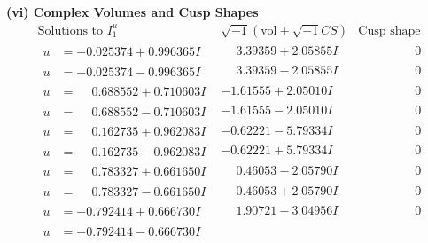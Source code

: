 \documentclass[1p]{elsarticle_modified}
\theoremstyle{definition}
\newcommand{\I}{\sqrt{-1}}
\begin{document}
\newpage\flushleft \textbf{(vi) Complex Volumes and Cusp Shapes}
$$\begin{array}{c|c|c}  
\text{Solutions to }I^u_{1}& \I (\text{vol} + \sqrt{-1}CS) & \text{Cusp shape}\\
 \hline 
\begin{aligned}
u &= -0.025374 + 0.996365 I\end{aligned}
 & \phantom{-}3.39359 + 2.05855 I & \phantom{-0.000000 } 0 \\ \hline\begin{aligned}
u &= -0.025374 - 0.996365 I\end{aligned}
 & \phantom{-}3.39359 - 2.05855 I & \phantom{-0.000000 } 0 \\ \hline\begin{aligned}
u &= \phantom{-}0.688552 + 0.710603 I\end{aligned}
 & -1.61555 + 2.05010 I & \phantom{-0.000000 } 0 \\ \hline\begin{aligned}
u &= \phantom{-}0.688552 - 0.710603 I\end{aligned}
 & -1.61555 - 2.05010 I & \phantom{-0.000000 } 0 \\ \hline\begin{aligned}
u &= \phantom{-}0.162735 + 0.962083 I\end{aligned}
 & -0.62221 - 5.79334 I & \phantom{-0.000000 } 0 \\ \hline\begin{aligned}
u &= \phantom{-}0.162735 - 0.962083 I\end{aligned}
 & -0.62221 + 5.79334 I & \phantom{-0.000000 } 0 \\ \hline\begin{aligned}
u &= \phantom{-}0.783327 + 0.661650 I\end{aligned}
 & \phantom{-}0.46053 - 2.05790 I & \phantom{-0.000000 } 0 \\ \hline\begin{aligned}
u &= \phantom{-}0.783327 - 0.661650 I\end{aligned}
 & \phantom{-}0.46053 + 2.05790 I & \phantom{-0.000000 } 0 \\ \hline\begin{aligned}
u &= -0.792414 + 0.666730 I\end{aligned}
 & \phantom{-}1.90721 - 3.04956 I & \phantom{-0.000000 } 0 \\ \hline\begin{aligned}
u &= -0.792414 - 0.666730 I\end{aligned}

\end{array}$$
\end{document}
